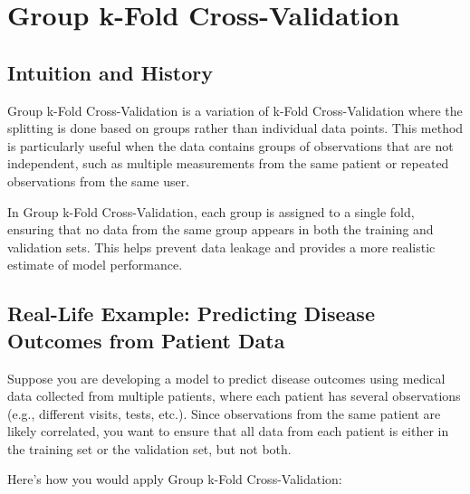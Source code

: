 \documentclass[10pt]{article}
\begin{document}
\section{Group k-Fold Cross-Validation}
\subsection{Intuition and History}
Group k-Fold Cross-Validation is a variation of k-Fold Cross-Validation where the splitting is done based on groups rather than individual data points. This method is particularly useful when the data contains groups of observations that are not independent, such as multiple measurements from the same patient or repeated observations from the same user.

In Group k-Fold Cross-Validation, each group is assigned to a single fold, ensuring that no data from the same group appears in both the training and validation sets. This helps prevent data leakage and provides a more realistic estimate of model performance.

\subsection{Real-Life Example: Predicting Disease Outcomes from Patient Data}
Suppose you are developing a model to predict disease outcomes using medical data collected from multiple patients, where each patient has several observations (e.g., different visits, tests, etc.). Since observations from the same patient are likely correlated, you want to ensure that all data from each patient is either in the training set or the validation set, but not both.

Here’s how you would apply Group k-Fold Cross-Validation:
\end{document}
